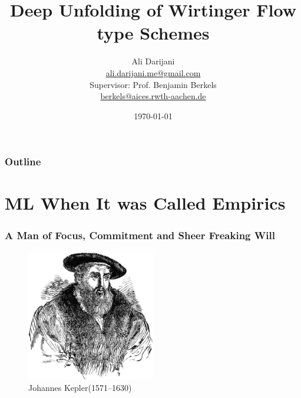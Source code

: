 \documentclass{beamer}
\theoremstyle{definition}
\theoremstyle{remark}
\begin{document}
\title[Deep Unfolding of Wirtinger Flow type Schemes]{Deep Unfolding of Wirtinger Flow type Schemes}
\author[]{Ali Darijani\\ \href{mailto:ali.darijani.me@gmail.com}{ali.darijani.me@gmail.com}\newline
\\ Supervisor: Prof. Benjamin Berkels\\ \href{mailto:berkels@aices.rwth-aachen.de}{berkels@aices.rwth-aachen.de}
}

\date{\today}

\begin{frame}
\titlepage
\end{frame}

\begin{frame}
\frametitle{Outline}

\tableofcontents[pausesections]
\end{frame}


\section[ML When It was Called Empirics]{ML When It was Called Empirics}

\begin{frame}
\frametitle{A Man of Focus, Commitment and Sheer Freaking Will}
  \begin{figure}[!htbp]
    \centering
    \includegraphics[width=0.5\textwidth]{./data/image/kepler.png}
  \caption{Johannes Kepler(1571--1630)}
  \label{image:kepler}
  \end{figure}
\end{frame}
\end{document}
